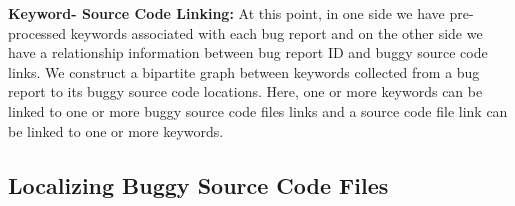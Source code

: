 \documentclass{sig-alternate}
\begin{document}
\textbf{Keyword- Source Code Linking:}
At this point, in one side we have pre-processed keywords associated with each bug report and on the other side we have a relationship information between bug report ID and buggy source code links. We construct a bipartite graph between keywords collected from a bug report to its buggy source code locations. Here, one or more keywords can be linked to one or more buggy source code files links and a source code file link can be linked to one or more keywords.



%
%
%

  

\subsection{Localizing Buggy Source Code Files} 
\end{document}
